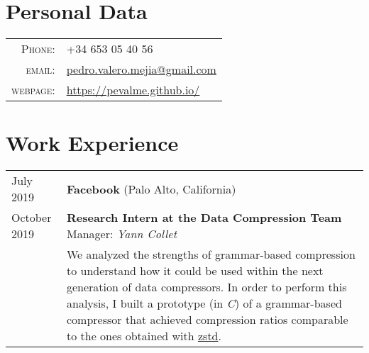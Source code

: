 \documentclass[a4paper,10pt]{article} %
\begin{document}
\pagestyle{empty} %




\par{\bigskip\par} %

\section{Personal Data}

\begin{tabular}{rl}
\textsc{Phone:} & +34 653 05 40 56\\
\textsc{email:} & \href{mailto:pedro.valero.mejia@gmail.com}{pedro.valero.mejia@gmail.com} \\
\textsc{webpage:} & \href{https://pevalme.github.io/}{https://pevalme.github.io/}\\
\end{tabular}

\section{Work Experience}

\begin{tabular}{p{2.5cm}p{13.2cm}}
{\small July 2019} & \textbf{Facebook} (Palo Alto, California) \\
{\small October 2019} & \textcolor{azureblue}{\textbf{Research Intern at the Data Compression Team}} \hfill Manager: \emph{Yann Collet} \\
& We analyzed the strengths of grammar-based compression to understand how it could be used within the next generation of data compressors.
In order to perform this analysis, I built a prototype (in \emph{C}) of a grammar-based compressor that achieved compression ratios comparable to the ones obtained with \href{https://facebook.github.io/zstd/}{zstd}.
\end{tabular}
\end{document}
